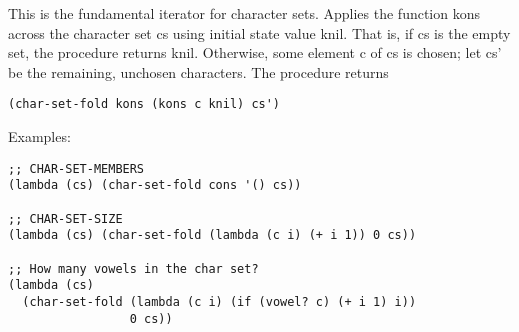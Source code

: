 \begin{entry}{%
  }

This is the fundamental iterator for character sets. Applies the
function kons across the character set cs using initial state value
knil. That is, if cs is the empty set, the procedure returns knil.
Otherwise, some element c of cs is chosen; let cs' be the remaining,
unchosen characters. The procedure returns

\begin{verbatim}
(char-set-fold kons (kons c knil) cs')
\end{verbatim}

Examples:

\begin{verbatim}
;; CHAR-SET-MEMBERS
(lambda (cs) (char-set-fold cons '() cs))

;; CHAR-SET-SIZE
(lambda (cs) (char-set-fold (lambda (c i) (+ i 1)) 0 cs))

;; How many vowels in the char set?
(lambda (cs) 
  (char-set-fold (lambda (c i) (if (vowel? c) (+ i 1) i))
                 0 cs))
\end{verbatim}
\end{entry}

